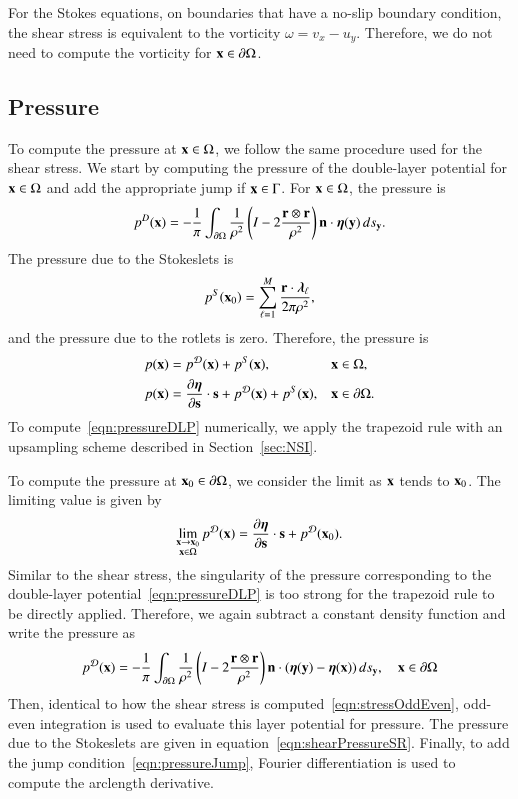 \documentclass[preprint, 10pt]{elsarticle}
\begin{document}
For the Stokes equations, on boundaries that have a no-slip boundary
condition, the shear stress is equivalent to the vorticity $\omega = v_x -
u_y$.  Therefore, we do not need to compute the vorticity for ${\mathbf{x}} \in
{\partial}\Omega$.

\subsection{Pressure}
\label{sec:pressure}
To compute the pressure at ${\mathbf{x}} \in \Omega$, we follow the
same procedure used for the shear stress.  We start by computing the
pressure of the double-layer potential for ${\mathbf{x}} \in \Omega$ and add the
appropriate jump if ${\mathbf{x}} \in \Gamma$. For ${\mathbf{x}} \in \Omega$, the pressure
is
\begin{align}
  p^{D}({\mathbf{x}}) = -\frac{1}{\pi}\int_{{\partial}\Omega} \frac{1}{\rho^2}
    \left(I - 2 \frac{{\mathbf{r}} \otimes {\mathbf{r}}}{\rho^2}\right) 
    {\mathbf{n}} \cdot {\boldsymbol\eta}({\mathbf{y}}) \,ds_{\mathbf{y}}.
    \label{eqn:pressureDLP}
\end{align}
The pressure due to the Stokeslets is
\begin{align}
  p^S({\mathbf{x}}_0) = \sum_{\ell=1}^{M}\frac{{\mathbf{r}} \cdot {\boldsymbol\lambda}_\ell}{2\pi\rho^2},
  \label{eqn:shearPressureSR}
\end{align}
and the pressure due to the rotlets is zero.  Therefore, the pressure is
\begin{align*}
  p({\mathbf{x}}) &= p^{{\mathcal{D}}}({\mathbf{x}}) + p^{S}({\mathbf{x}}), \quad &&{\mathbf{x}} \in \Omega,\\
  p({\mathbf{x}}) &= \frac{\partial {\boldsymbol\eta}}{\partial {\mathbf{s}}} \cdot {\mathbf{s}} + p^{{\mathcal{D}}}({\mathbf{x}}) + 
              p^{S}({\mathbf{x}}), && {\mathbf{x}} \in {\partial}\Omega.
\end{align*}
To compute~\eqref{eqn:pressureDLP} numerically, we apply the trapezoid
rule with an upsampling scheme described in Section~\ref{sec:NSI}.

To compute the pressure at ${\mathbf{x}}_0 \in {\partial}\Omega$, we consider the limit
as ${\mathbf{x}}$ tends to ${\mathbf{x}}_0$.  The limiting value is given
by~\cite{qua-bir2014a}
\begin{align}
  \lim_{\substack{{\mathbf{x}} \rightarrow {\mathbf{x}}_0 \\ {\mathbf{x}} \in \Omega}}p^{\mathcal{D}}({\mathbf{x}}) =  
    \frac{\partial {\boldsymbol\eta}}{\partial {\mathbf{s}}} \cdot {\mathbf{s}} + p^{{\mathcal{D}}}({\mathbf{x}}_0).
  \label{eqn:pressureJump}
\end{align}
Similar to the shear stress, the singularity of the pressure
corresponding to the double-layer potential~\eqref{eqn:pressureDLP} is
too strong for the trapezoid rule to be directly applied.  Therefore, we
again subtract a constant density function and write the pressure as
\begin{align*}
  p^{\mathcal{D}}({\mathbf{x}}) = -\frac{1}{\pi}\int_{{\partial}\Omega} \frac{1}{\rho^2}
    \left(I - 2 \frac{{\mathbf{r}} \otimes {\mathbf{r}}}{\rho^2}\right) 
    {\mathbf{n}} \cdot ({\boldsymbol\eta}({\mathbf{y}}) - {\boldsymbol\eta}({\mathbf{x}})) \,ds_{\mathbf{y}}, 
    \quad {\mathbf{x}} \in {\partial}\Omega
\end{align*}
Then, identical to how the shear stress is
computed~\eqref{eqn:stressOddEven}, odd-even integration is used to
evaluate this layer potential for pressure.  The pressure due to the
Stokeslets are given in equation~\eqref{eqn:shearPressureSR}.  Finally,
to add the jump condition~\eqref{eqn:pressureJump}, Fourier
differentiation is used to compute the arclength derivative. 
\end{document}

